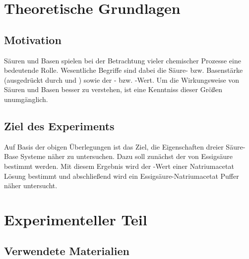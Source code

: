 \documentclass{article}
\begin{document}
  \section{Theoretische Grundlagen}
  
    \subsection{Motivation} \label{sec:Motivation}
      Säuren und Basen spielen bei der Betrachtung vieler chemischer Prozesse eine bedeutende Rolle. Wesentliche Begriffe sind dabei die Säure- bzw. Basenstärke (ausgedrückt durch \pKa und \pKb) sowie der \pH- bzw. \pOH-Wert. Um die Wirkungsweise von Säuren und Basen besser zu verstehen, ist eine Kenntniss dieser Größen unumgänglich.  
  
    \subsection{Ziel des Experiments}
    
      Auf Basis der obigen Überlegungen ist das Ziel, die Eigenschaften dreier Säure-Base Systeme näher zu untersuchen. Dazu soll zunächst der \pKa von Essigsäure bestimmt werden. Mit diesem Ergebnis wird der \pH-Wert einer Natriumacetat Lösung bestimmt und abschließend wird ein Essigsäure-Natriumacetat Puffer näher untersucht.
    
  \section{Experimenteller Teil}
    
    \subsection{Verwendete Materialien}
              
\end{document}
